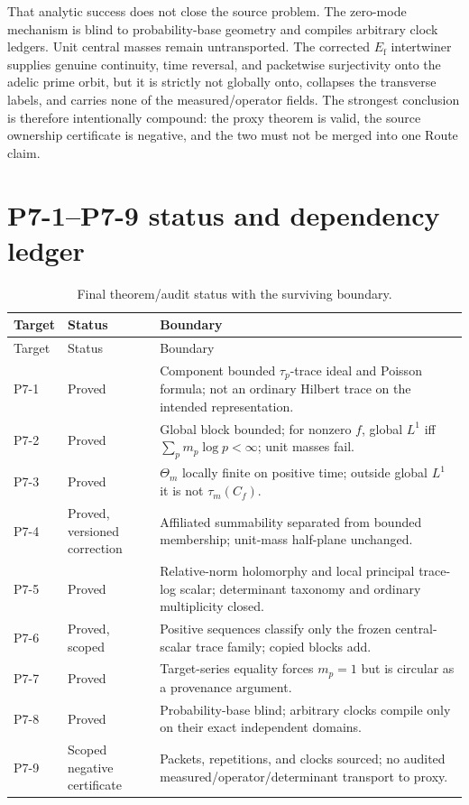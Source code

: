 \documentclass[11pt,a4paper]{article}
\theoremstyle{definition}
\newcommand{\Ef}{E_{\mathrm f}}
\begin{document}
That analytic success does not close the source problem.  The zero-mode
mechanism is blind to probability-base geometry and compiles arbitrary clock
ledgers.  Unit central masses remain untransported.  The corrected $\Ef$
intertwiner supplies genuine continuity, time reversal, and packetwise
surjectivity onto the adelic prime orbit, but it is strictly not globally onto,
collapses the transverse labels, and carries none of the measured/operator
fields.  The strongest conclusion is therefore intentionally compound: the
proxy theorem is valid, the source ownership certificate is negative, and the
two must not be merged into one Route claim.

\appendix
\section{P7-1--P7-9 status and dependency ledger}

\begin{longtable}{@{}p{}p{}p{}@{}}
\caption{Final theorem/audit status with the surviving boundary.}
\label{tab:p7-status}\\
\toprule
Target & Status & Boundary \\
\midrule
\endfirsthead
\toprule
Target & Status & Boundary \\
\midrule
\endhead
P7-1 & Proved & Component bounded $\tau_p$-trace ideal and Poisson formula;
not an ordinary Hilbert trace on the intended representation. \\
P7-2 & Proved & Global block bounded; for nonzero $f$, global $L^1$ iff
$\sum_pm_p\log p<\infty$; unit masses fail. \\
P7-3 & Proved & $\Theta_m$ locally finite on positive time; outside global
$L^1$ it is not $\tau_m(C_f)$. \\
P7-4 & Proved, versioned correction & Affiliated summability separated from
bounded membership; unit-mass half-plane unchanged. \\
P7-5 & Proved & Relative-norm holomorphy and local principal trace-log scalar;
determinant taxonomy and ordinary multiplicity closed. \\
P7-6 & Proved, scoped & Positive sequences classify only the frozen
central-scalar trace family; copied blocks add. \\
P7-7 & Proved & Target-series equality forces $m_p=1$ but is circular as a
provenance argument. \\
P7-8 & Proved & Probability-base blind; arbitrary clocks compile only on their
exact independent domains. \\
P7-9 & Scoped negative certificate & Packets, repetitions, and clocks sourced;
no audited measured/operator/determinant transport to proxy. \\
\bottomrule
\end{longtable}
\end{document}
